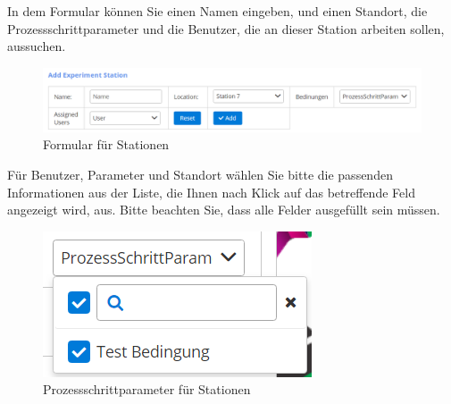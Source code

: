 \documentclass[enabledeprecatedfontcommands,fontsize=12pt,paper=a4,twoside]{scrartcl}
\begin{document}
In dem Formular können Sie einen Namen eingeben, und einen Standort, die Prozessschrittparameter und die Benutzer, die an dieser Station arbeiten sollen, aussuchen. \\

\begin{figure}[h!]
\begin{center}
 \includegraphics[width=\textwidth]{screenshots/admin/stationformular.png}
  \caption{Formular für Stationen}
  \label{fig:boat2}
\end{center}
\end{figure}

Für Benutzer, Parameter und Standort wählen Sie bitte die passenden Informationen aus der Liste, die Ihnen nach Klick auf das betreffende Feld angezeigt wird, aus. Bitte beachten Sie, dass alle Felder ausgefüllt sein müssen. \\

\begin{figure}[h!]
\begin{center}
 \includegraphics[width=\textwidth]{screenshots/admin/stationpsp.png}
  \caption{Prozessschrittparameter für Stationen}
  \label{fig:boat2}
\end{center}
\end{figure}
\end{document}
